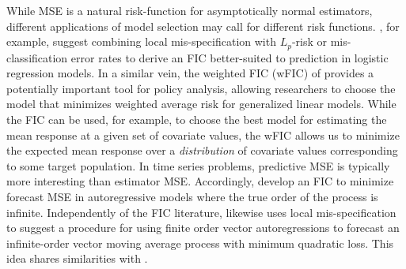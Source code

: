 While MSE is a natural risk-function for asymptotically normal estimators, different applications of model selection may call for different risk functions. \cite{ClaeskensCroux2006}, for example, suggest combining local mis-specification with $L_p$-risk or mis-classification error rates to derive an FIC better-suited to prediction in logistic regression models. 
In a similar vein, the weighted FIC (wFIC) of \cite{ClaeskensHjort2008} provides a potentially important tool for policy analysis, allowing researchers to choose the model that minimizes weighted average risk for generalized linear models. 
While the FIC can be used, for example, to choose the best model for estimating the mean response at a given set of covariate values, the wFIC allows us to minimize the expected mean response over a \emph{distribution} of covariate values corresponding to some target population.
In time series problems, predictive MSE is typically more interesting than estimator MSE.
Accordingly, \cite{ClaeskensCroux} develop an FIC to minimize forecast MSE in autoregressive models where the true order of the process is infinite. 
Independently of the FIC literature, \cite{Schorfheide2005} likewise uses local mis-specification to suggest a procedure for using finite order vector autoregressions to forecast an infinite-order vector moving average process with minimum quadratic loss. 
This idea shares similarities with \cite{Skouras2001}.
 
